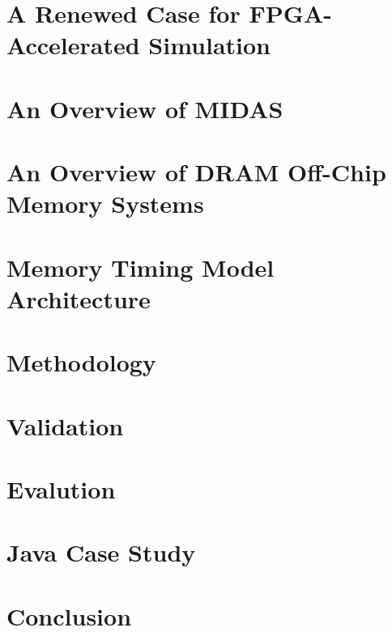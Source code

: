 \documentclass[masters]{ucbthesis}
\begin{document}
\chapter{A Renewed Case for FPGA-Accelerated Simulation}


\chapter{An Overview of MIDAS}


\chapter{An Overview of DRAM Off-Chip Memory Systems}


\chapter{Memory Timing Model Architecture}


\chapter{Methodology}


\chapter{Validation}


\chapter{Evalution}


\chapter{Java Case Study}


\chapter{Conclusion}


\printbibliography
\end{document}
